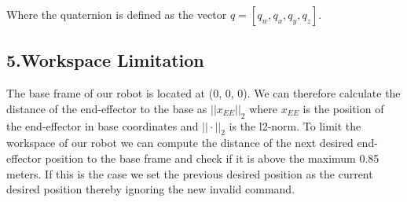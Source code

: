 \documentclass[a4paper,12pt]{article}
\begin{document}
Where the quaternion is defined as the vector $q = [q_w, q_x, q_y, q_z]$.

\subsection*{5.Workspace Limitation}
The base frame of our robot is located at (0, 0, 0). We can therefore calculate the distance of the end-effector to the base as $||x_{EE}||_2$ where $x_{EE}$ is the position of the end-effector in base coordinates and $||·||_2$ is the l2-norm. To limit the workspace of our robot we can compute the distance of the next desired end-effector position to the base frame and check if it is above the maximum 0.85 meters. If this is the case we set the previous desired position as the current desired position thereby ignoring the new invalid command.


\end{document}
